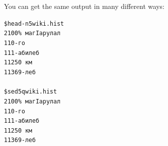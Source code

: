 \documentclass[10pt, compress]{beamer}
\begin{document}
\begin{frame}

You can get the same output in many different ways:

\begin{alltt}
\$ head -n 5 wiki.hist   \\
      2 100\% магӀарулал  \\
      1 10-го  \\
      1 11-абилеб  \\
      1 1250 км  \\
      1 1369-леб  \\
~  \\
\$ sed 5q wiki.hist   \\
      2 100\% магӀарулал  \\
      1 10-го  \\
      1 11-абилеб  \\
      1 1250 км  \\
      1 1369-леб  \\
~\\
\end{alltt}

\end{frame}
\end{document}
